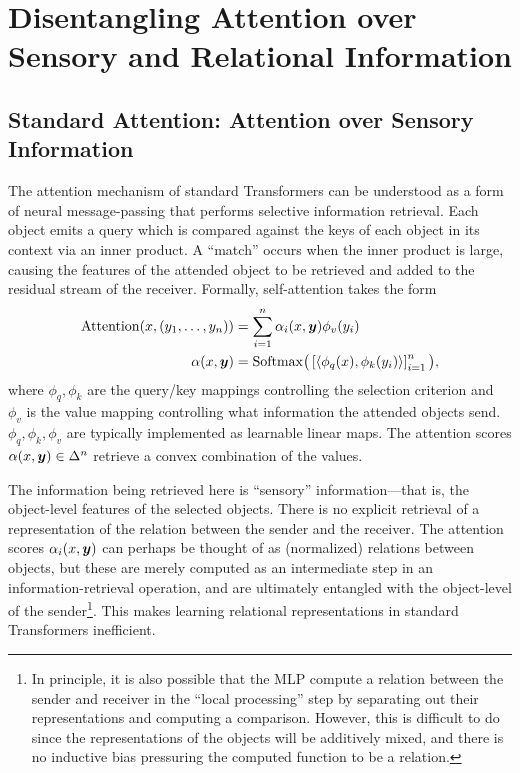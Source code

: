 \section{Disentangling Attention over Sensory and Relational Information}

\subsection{Standard Attention: Attention over Sensory Information}

The attention mechanism of standard Transformers can be understood as a form of neural message-passing that performs selective information retrieval. Each object emits a query which is compared against the keys of each object in its context via an inner product. A ``match'' occurs when the inner product is large, causing the features of the attended object to be retrieved and added to the residual stream of the receiver. Formally, self-attention takes the form
\begin{equation}\label{eq:self_attn}
  \begin{split}
    \mathrm{Attention}(x, (y_1, \ldots, y_n)) &= \sum_{i=1}^{n} \alpha_i(x, \bm{y}) \phi_v(y_i) \\
    \alpha(x, \bm{y}) &= \mathrm{Softmax}\big(\left[\left \langle \phi_q(x), \phi_k(y_i) \right\rangle\right]_{i=1}^{n}\big),
  \end{split}
\end{equation}
where $\phi_q,\phi_k$ are the query/key mappings controlling the selection criterion and $\phi_v$ is the value mapping controlling what information the attended objects send. $\phi_q, \phi_k, \phi_v$ are typically implemented as learnable linear maps. The attention scores $\alpha(x, \bm{y}) \in \Delta^n$ retrieve a convex combination of the values.

The information being retrieved here is ``sensory'' information---that is, the object-level features of the selected objects. There is no explicit retrieval of a representation of the relation between the sender and the receiver. The attention scores $\alpha_i(x, \bm{y})$ can perhaps be thought of as (normalized) relations between objects, but these are merely computed as an intermediate step in an information-retrieval operation, and are ultimately entangled with the object-level of the sender\footnote{In principle, it is also possible that the MLP compute a relation between the sender and receiver in the ``local processing'' step by separating out their representations and computing a comparison. However, this is difficult to do since the representations of the objects will be additively mixed, and there is no inductive bias pressuring the computed function to be a relation.}. This makes learning relational representations in standard Transformers inefficient.

